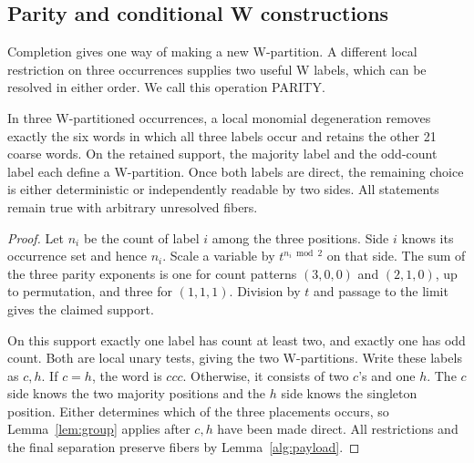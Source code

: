 \subsection{Parity and conditional W constructions}
\label{alg:parity-section}

Completion gives one way of making a new W-partition.  A different local
restriction on three occurrences supplies two useful W labels, which can
be resolved in either order.  We call this operation PARITY.

\begin{lemma}
\label{alg:parity}
In three W-partitioned occurrences, a local monomial degeneration removes
exactly the six words in which all three labels occur and retains the
other 21 coarse words.  On the retained support, the majority label and
the odd-count label each define a W-partition.  Once both labels are direct,
the remaining choice is either deterministic or independently readable by
two sides.  All statements remain true with arbitrary unresolved fibers.
\end{lemma}
\begin{proof}
Let \(n_i\) be the count of label \(i\) among the three positions.
Side \(i\) knows its occurrence set and hence \(n_i\).
Scale a variable by \(t^{n_i\bmod2}\) on that side.
The sum of the three parity exponents is one for count patterns
\((3,0,0)\) and \((2,1,0)\), up to permutation, and three for
\((1,1,1)\).  Division by \(t\) and passage to the limit gives the
claimed support.

On this support exactly one label has count at least two, and exactly one
has odd count.  Both are local unary tests, giving the two W-partitions.
Write these labels as \(c,h\).  If \(c=h\), the word is \(ccc\).
Otherwise, it consists of two \(c\)'s and one \(h\).  The \(c\) side
knows the two majority positions and the \(h\) side knows the singleton
position.  Either determines which of the three placements occurs, so
Lemma~\ref{lem:group} applies after \(c,h\) have been made direct.
All restrictions and the final separation preserve fibers by
Lemma~\ref{alg:payload}.
\end{proof}

